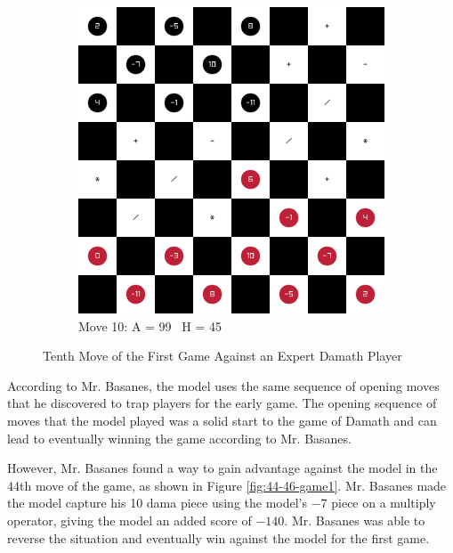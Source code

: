 \begin{figure}[H]
    \centering
    \begin{subfigure}{0.3\textwidth}
        \centering
        \includegraphics[width=\textwidth]{images/games/game1/move_11.png}
        \caption*{Move 10: A = 99 \textbar\ H = 45}
    \end{subfigure}
    \caption{Tenth Move of the First Game Against an Expert Damath Player}
    \label{fig:10-game1}
\end{figure}

According to Mr. Basanes, the model uses the same sequence of opening moves that he discovered to trap players for the early game. The opening sequence of moves that the model played was a solid start to the game of Damath and can lead to eventually winning the game according to Mr. Basanes.

However, Mr. Basanes found a way to gain advantage against the model in the 44th move of the game, as shown in Figure \ref{fig:44-46-game1}. Mr. Basanes made the model capture his 10 dama piece using the model's $-7$ piece on a multiply operator, giving the model an added score of $-140$. Mr. Basanes was able to reverse the situation and eventually win against the model for the first game. 

